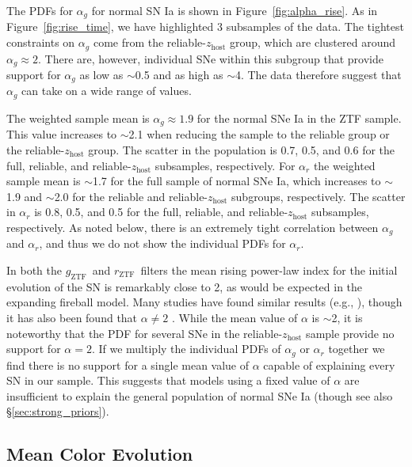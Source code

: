 \documentclass[twocolumn]{./aastex63}
\newcommand{\rztf}{$r_\mathrm{ZTF}$}
\newcommand{\gztf}{$g_\mathrm{ZTF}$}
\begin{document}
The PDFs for $\alpha_g$ for normal SN Ia is shown in
Figure~\ref{fig:alpha_rise}. As in Figure~\ref{fig:rise_time}, we have
highlighted 3 subsamples of the data. The tightest constraints on $\alpha_g$
come from the reliable-$z_\mathrm{host}$ group, which are clustered around
$\alpha_g \approx 2$. There are, however, individual SNe within this subgroup
that provide support for $\alpha_g$ as low as $\sim$0.5 and as high as
$\sim$4. The data therefore suggest that $\alpha_g$ can take on a wide range
of values.

The weighted sample mean is $\alpha_g \approx 1.9$ for the normal SNe Ia in
the ZTF sample. This value increases to $\sim$2.1 when reducing the sample to
the reliable group or the reliable-$z_\mathrm{host}$ group. The scatter in the
population is 0.7, 0.5, and 0.6 for the full, reliable, and
reliable-$z_\mathrm{host}$ subsamples, respectively. For $\alpha_r$ the
weighted sample mean is $\sim$1.7 for the full sample of normal SNe Ia, which
increases to $\sim$1.9 and $\sim$2.0 for the reliable and
reliable-$z_\mathrm{host}$ subgroups, respectively. The scatter in $\alpha_r$
is 0.8, 0.5, and 0.5 for the full, reliable, and reliable-$z_\mathrm{host}$
subsamples, respectively. As noted below, there is an extremely tight
correlation between $\alpha_g$ and $\alpha_r$, and thus we do not show the
individual PDFs for $\alpha_r$.

In both the \gztf\ and \rztf\ filters the mean rising power-law index for the
initial evolution of the SN is remarkably close to 2, as would be expected in
the expanding fireball model. Many studies have found similar results (e.g.,
\citealt{Conley06,Hayden10,Ganeshalingam11,Zheng17a}), though it has also been
found that $\alpha \neq 2$ \citep{Firth15}. While the mean value of $\alpha$
is $\sim$2, it is noteworthy that the PDF for several SNe in the
reliable-$z_\mathrm{host}$ sample provide no support for $\alpha = 2$. If we
multiply the individual PDFs of $\alpha_g$ or $\alpha_r$ together we find
there is no support for a single mean value of $\alpha$ capable of explaining
every SN in our sample. This suggests that models using a fixed value of
$\alpha$ are insufficient to explain the general population of normal SNe Ia
(though see also \S\ref{sec:strong_priors}).



\subsection{Mean Color Evolution}\label{sec:colors}
\end{document}
